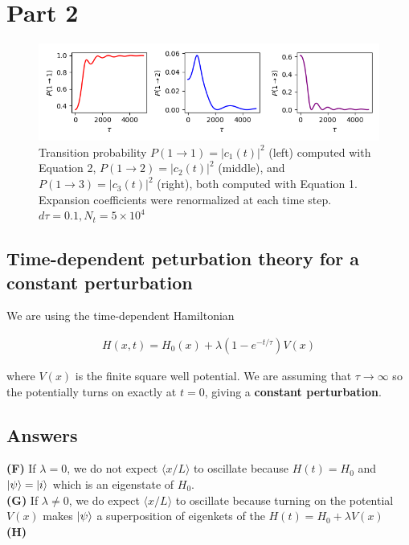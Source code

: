 \documentclass[12pt]{article}
\theoremstyle{definition}
\begin{document}
{\section{Part 2}

\begin{figure}
\includegraphics[scale=1]{Figure_2.png}
\centering
\caption{Transition probability $P(1\rightarrow 1) = |c_{1}(t)|^{2}$ (left) computed with Equation 2, $P(1\rightarrow 2) = |c_{2}(t)|^{2}$ (middle), and $P(1\rightarrow 3) = |c_{3}(t)|^{2}$ (right), both computed with Equation 1. Expansion coefficients were renormalized at each time step. $d\tau = 0.1, N_{t} = 5\times 10^{4}$}
\end{figure}


\subsection{Time-dependent peturbation theory for a constant perturbation}


We are using the time-dependent Hamiltonian

\begin{align*}
H(x,t) = H_{0}(x) + \lambda(1-e^{-t/\tau})V(x)
\end{align*}

where $V(x)$ is the finite square well potential. We are assuming that $\tau\rightarrow\infty$ so the potentially turns on exactly at $t=0$, giving a \textbf{constant perturbation}. 

\subsection{Answers}


\noindent \textbf{(F)} If $\lambda = 0$, we do not expect $\langle x/L\rangle$ to oscillate because $H(t) = H_{0}$ and $\ket{\psi} = \ket{i}$ which is an eigenstate of $H_{0}$.\\
\noindent \textbf{(G)} If $\lambda \neq 0$, we do expect $\langle x/L\rangle$ to oscillate because turning on the potential $V(x)$ makes $\ket{\psi}$ a superposition of eigenkets of the $H(t) = H_{0} + \lambda V(x)$\\
\noindent \textbf{(H)}

}
\end{document}
